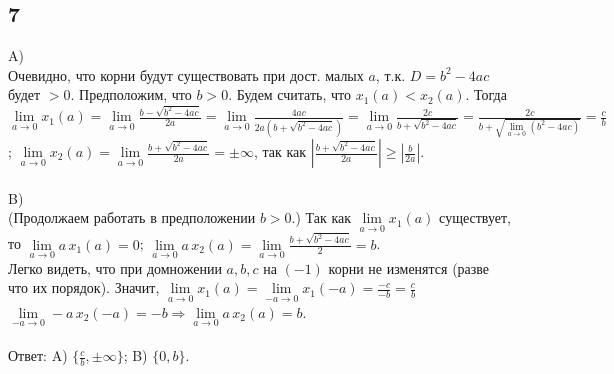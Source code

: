 		\subsection{7}
		A)\\
		Очевидно, что корни будут существовать при дост. малых $a$, т.к. $D = b^2 - 4ac$ будет $>0$. Предположим, что $b > 0$. Будем считать, что $x_1(a) < x_2(a)$. Тогда $\lim\limits_{a \rightarrow 0}x_1(a) = \lim\limits_{a \rightarrow 0} \frac{b - \sqrt{b^2 - 4ac}}{2a} = \lim\limits_{a \rightarrow 0} \frac{4ac}{2a(b + \sqrt{b^2 - 4ac})} = \lim\limits_{a \rightarrow 0} \frac{2c}{b+\sqrt{b^2-4ac}} = \frac{2c}{b + \sqrt{\lim\limits_{a \rightarrow 0} (b^2 - 4ac)} } = \frac{c}{b}$; $\lim\limits_{a \rightarrow 0} x_2(a) = \lim\limits_{a \rightarrow 0} \frac {b + \sqrt{b^2 - 4ac}}{2a} = \pm\infty$, так как $|\frac {b + \sqrt{b^2 - 4ac}}{2a}| \geqslant |\frac{b}{2a}|$.\\
		\\
		B)\\
		(Продолжаем работать в предположении $b > 0$.) Так как $\lim\limits_{a \rightarrow 0} x_1(a)$ существует, то $\lim\limits_{a \rightarrow 0} a\,x_1(a) = 0$; $\lim\limits_{a \rightarrow 0} a\,x_2(a) = \lim\limits_{a \rightarrow 0} \frac{b+\sqrt{b^2 - 4ac}}{2} = b$.\\
		Легко видеть, что при домножении $a, b, c$ на $(-1)$ корни не изменятся (разве что их порядок). Значит, $\lim\limits_{a \rightarrow 0}x_1(a) = \lim\limits_{-a \rightarrow 0}x_1(-a) = \frac{-c}{-b} = \frac{c}{b}$ $\lim\limits_{-a \rightarrow 0} -a\,x_2(-a) = -b \Rightarrow \lim\limits_{a \rightarrow 0} a\,x_2(a) = b$.\\
		\\
		Ответ: A) $\{\frac{c}{b}, \pm\infty\}$; B) $\{0, b\}$.
		
